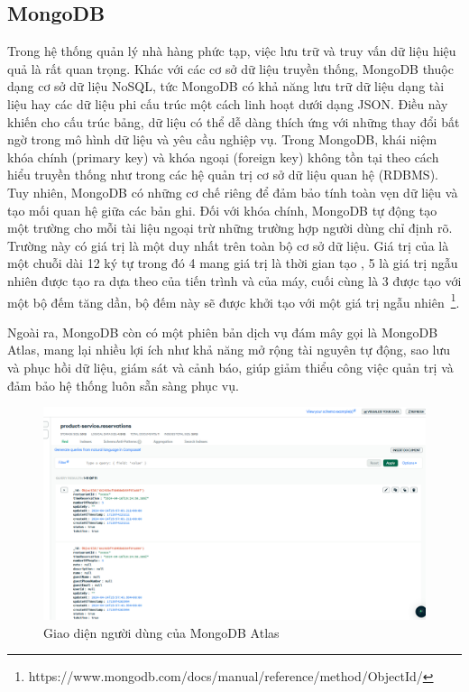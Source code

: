 \subsection{MongoDB}
Trong hệ thống quản lý nhà hàng phức tạp, việc lưu trữ và truy vấn dữ liệu hiệu quả là rất quan trọng.
Khác với các cơ sở dữ liệu truyền thống, MongoDB thuộc dạng cơ sở dữ liệu NoSQL, tức MongoDB có khả năng lưu trữ dữ liệu dạng tài liệu hay các dữ liệu phi cấu trúc một cách linh hoạt dưới dạng JSON. Điều này khiến cho cấu trúc bảng, dữ liệu có thể dễ dàng thích ứng với những thay đổi bất ngờ trong mô hình dữ liệu và yêu cầu nghiệp vụ.
Trong MongoDB, khái niệm khóa chính (primary key) và khóa ngoại (foreign key) không tồn tại theo cách hiểu truyền thống như trong các hệ quản trị cơ sở dữ liệu quan hệ (RDBMS). Tuy nhiên, MongoDB có những cơ chế riêng để đảm bảo tính toàn vẹn dữ liệu và tạo mối quan hệ giữa các bản ghi.
Đối với khóa chính, MongoDB tự động tạo một trường  cho mỗi tài liệu ngoại trừ những trường hợp người dùng chỉ định rõ.
Trường này có giá trị là một  duy nhất trên toàn bộ cơ sở dữ liệu.
Giá trị của  là một chuỗi  dài 12 ký tự trong đó 4  mang giá trị là thời gian tạo , 5  là giá trị ngẫu nhiên được tạo ra dựa theo  của tiến trình và của máy, cuối cùng là 3  được tạo với một bộ đếm tăng dần, bộ đếm này sẽ được khởi tạo với một giá trị ngẫu nhiên~\footnote{https://www.mongodb.com/docs/manual/reference/method/ObjectId/}.

Ngoài ra, MongoDB còn có một phiên bản dịch vụ đám mây gọi là MongoDB Atlas, mang lại nhiều lợi ích như khả năng mở rộng tài nguyên tự động, sao lưu và phục hồi dữ liệu, giám sát và cảnh báo, giúp giảm thiểu công việc quản trị và đảm bảo hệ thống luôn sẵn sàng phục vụ.

\begin{figure}[h]
	\centering
	\includegraphics[width=\textwidth]{images/hChip/MongoDB/mongodb-preview.png}
	\caption{Giao diện người dùng của MongoDB Atlas}
	\label{fig:mongoDB-preview}
\end{figure}


